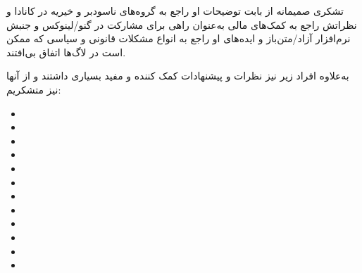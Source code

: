 تشکری صمیمانه از
بابت توضیحات او راجع به گروه‌های ناسودبر و خیریه در کانادا و نظراتش راجع به کمک‌های مالی به‌عنوان
راهی برای مشارکت در گنو/لینوکس و جنبش نرم‌افزار آزاد/متن‌باز و ایده‌های او راجع به انواع مشکلات قانونی
و سیاسی که ممکن است در لاگ‌ها اتفاق بی‌افتند.

به‌علاوه افراد زیر نیز نظرات و پیشنهادات کمک کننده و مفید بسیاری داشتند و از آنها نیز متشکریم:

\begin{itemize}
\item {}
\item {}
\item {}
\item {}
\item {}
\item {}
\item {}
\item {}
\item {}
\item {}
\item {}
\item {}
\end{itemize}

